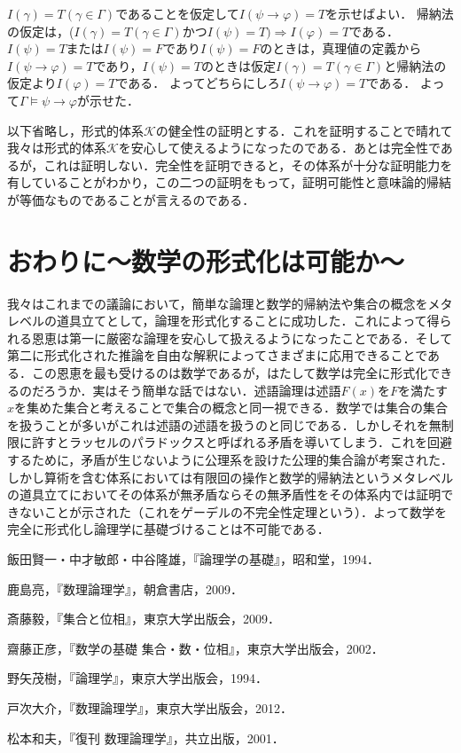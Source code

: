 \documentclass[10pt,b5paper,papersize,dvipdfmx]{jsbook}
\begin{document}
$I(\gamma)=T(\gamma \in \Gamma)$であることを仮定して$I(\psi \to \varphi)=T$を示せばよい．
帰納法の仮定は，($I(\gamma)=T(\gamma \in \Gamma)$かつ$I(\psi)=T) \Rightarrow I(\varphi)=T$である．
$I(\psi) = T$または$I(\psi) = F$であり$I(\psi) = F$のときは，真理値の定義から$I(\psi \to \varphi)=T$であり，$I(\psi) = T$のときは仮定$I(\gamma)=T(\gamma \in \Gamma)$と帰納法の仮定より$I(\varphi)=T$である．
よってどちらにしろ$I(\psi \to \varphi)=T$である．
よって$\Gamma \models \psi \to \varphi$が示せた．\par
以下省略し，形式的体系$\mathcal K$の健全性の証明とする．これを証明することで晴れて我々は形式的体系$\mathcal K$を安心して使えるようになったのである．あとは完全性であるが，これは証明しない．完全性を証明できると，その体系が十分な証明能力を有していることがわかり，この二つの証明をもって，証明可能性と意味論的帰結が等価なものであることが言えるのである．

\section{おわりに～数学の形式化は可能か～}
我々はこれまでの議論において，簡単な論理と数学的帰納法や集合の概念をメタレベルの道具立てとして，論理を形式化することに成功した．これによって得られる恩恵は第一に厳密な論理を安心して扱えるようになったことである．そして第二に形式化された推論を自由な解釈によってさまざまに応用できることである．この恩恵を最も受けるのは数学であるが，はたして数学は完全に形式化できるのだろうか．実はそう簡単な話ではない．述語論理は述語$F(x)$を$F$を満たす$x$を集めた集合と考えることで集合の概念と同一視できる．数学では集合の集合を扱うことが多いがこれは述語の述語を扱うのと同じである．しかしそれを無制限に許すとラッセルのパラドックスと呼ばれる矛盾を導いてしまう．これを回避するために，矛盾が生じないように公理系を設けた公理的集合論が考案された．しかし算術を含む体系においては有限回の操作と数学的帰納法というメタレベルの道具立てにおいてその体系が無矛盾ならその無矛盾性をその体系内では証明できないことが示された（これをゲーデルの不完全性定理という）．よって数学を完全に形式化し論理学に基礎づけることは不可能である．

\clearpage
\begin{thebibliography}{99}
  \item 飯田賢一・中才敏郎・中谷隆雄，『論理学の基礎』，昭和堂，1994．
  \item 鹿島亮，『数理論理学』，朝倉書店，2009．
  \item 斎藤毅，『集合と位相』，東京大学出版会，2009．
  \item 齋藤正彦，『数学の基礎 集合・数・位相』，東京大学出版会，2002．
  \item 野矢茂樹，『論理学』，東京大学出版会，1994．
  \item 戸次大介，『数理論理学』，東京大学出版会，2012．
  \item 松本和夫，『復刊 数理論理学』，共立出版，2001．
\end{thebibliography}
\end{document}
